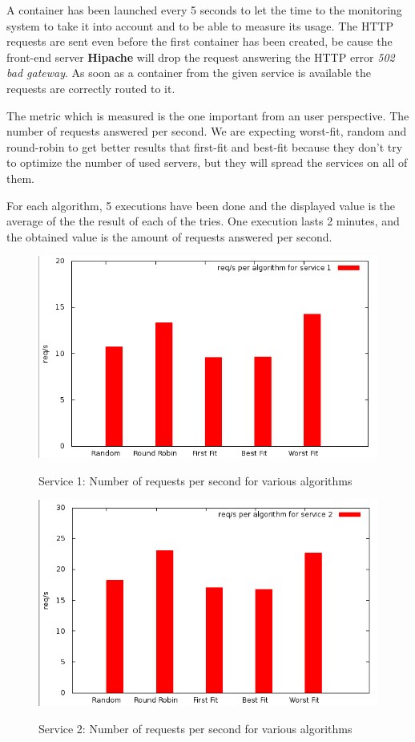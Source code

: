 A container has been launched every 5 seconds to let the time to the monitoring
system to take it into account and to be able to measure its usage. The HTTP
requests are sent even before the first container has been created, be cause the
front-end server \textbf{Hipache} will drop the request answering the HTTP error
\textit{502 bad gateway}. As soon as a container from the given service is available
the requests are correctly routed to it.

The metric which is measured is the one important from an user perspective. The
number of requests answered per second. We are expecting worst-fit, random and
round-robin to get better results that first-fit and best-fit because they
don't try to optimize the number of used servers, but they will spread the services
on all of them.

For each algorithm, 5 executions have been done and the displayed value is the average
of the the result of each of the tries. One execution lasts 2 minutes, and the obtained
value is the amount of requests answered per second.

\begin{figure}[h!]
\includegraphics[width=\textwidth]{./Images/BinPacking/exp2-service1.png}
\label{fig:exp2service1}
\caption{Service 1: Number of requests per second for various algorithms}
\end{figure}

\begin{figure}[h!]
\includegraphics[width=\textwidth]{./Images/BinPacking/exp2-service2.png}
\label{fig:exp2service2}
\caption{Service 2: Number of requests per second for various algorithms}
\end{figure}

